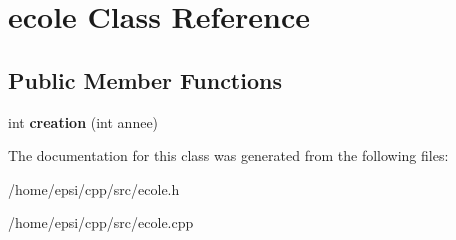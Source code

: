 \hypertarget{classecole}{}\section{ecole Class Reference}
\label{classecole}
\subsection*{Public Member Functions}
\begin{DoxyCompactItemize}
\item 
\mbox{\label{classecole_a76c2d0b70b5fdc49deb594a750322732}} 
int {\bfseries creation} (int annee)
\end{DoxyCompactItemize}


The documentation for this class was generated from the following files\+:\begin{DoxyCompactItemize}
\item 
/home/epsi/cpp/src/ecole.\+h\item 
/home/epsi/cpp/src/ecole.\+cpp\end{DoxyCompactItemize}
